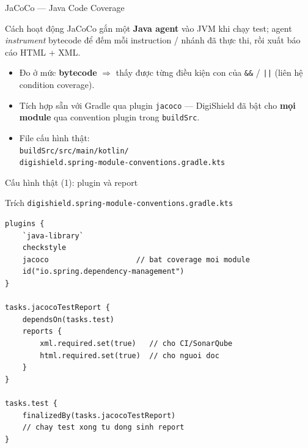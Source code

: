 \documentclass[aspectratio=169,12pt]{beamer}
\begin{document}
\begin{frame}{JaCoCo --- Java Code Coverage}
  \begin{block}{Cách hoạt động \cite{jacoco}}
    JaCoCo gắn một \textbf{Java agent} vào JVM khi chạy test; agent
    \textit{instrument} bytecode để đếm mỗi instruction / nhánh đã
    thực thi, rồi xuất báo cáo HTML + XML.
  \end{block}

  \vspace{0.3em}
  \begin{itemize}
    \item Đo ở mức \textbf{bytecode} $\Rightarrow$ thấy được từng
          điều kiện con của \texttt{\&\&} / \texttt{||}
          (liên hệ condition coverage).
    \item Tích hợp sẵn với Gradle qua plugin \texttt{jacoco} ---
          DigiShield đã bật cho \textbf{mọi module} qua convention plugin
          trong \texttt{buildSrc}.
    \item File cấu hình thật:\\
          {\small\texttt{buildSrc/src/main/kotlin/}\\
          \texttt{digishield.spring-module-conventions.gradle.kts}}
  \end{itemize}
\end{frame}

\begin{frame}[fragile]{Cấu hình thật (1): plugin và report}
  \begin{block}{Trích \texttt{digishield.spring-module-conventions.gradle.kts}}
\begin{lstlisting}[basicstyle=\ttfamily\scriptsize]
plugins {
    `java-library`
    checkstyle
    jacoco                    // bat coverage moi module
    id("io.spring.dependency-management")
}

tasks.jacocoTestReport {
    dependsOn(tasks.test)
    reports {
        xml.required.set(true)   // cho CI/SonarQube
        html.required.set(true)  // cho nguoi doc
    }
}

tasks.test {
    finalizedBy(tasks.jacocoTestReport)
    // chay test xong tu dong sinh report
}
\end{lstlisting}
  \end{block}
\end{frame}
\end{document}
